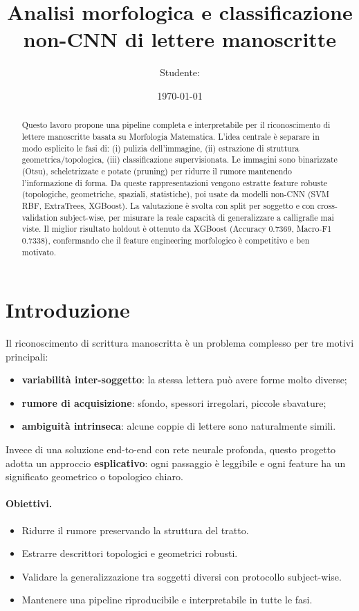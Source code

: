 \documentclass[a4paper,12pt]{article}
\title{Analisi morfologica e classificazione non-CNN di lettere manoscritte}
\author{Studente: \rule{6cm}{0.4pt}}
\date{\today}
\begin{document}
\maketitle

\begin{abstract}
Questo lavoro propone una pipeline completa e interpretabile per il riconoscimento di lettere manoscritte basata su Morfologia Matematica.
L'idea centrale è separare in modo esplicito le fasi di: (i) pulizia dell'immagine, (ii) estrazione di struttura geometrica/topologica, (iii) classificazione supervisionata.
Le immagini sono binarizzate (Otsu), scheletrizzate e potate (pruning) per ridurre il rumore mantenendo l'informazione di forma.
Da queste rappresentazioni vengono estratte feature robuste (topologiche, geometriche, spaziali, statistiche), poi usate da modelli non-CNN (SVM RBF, ExtraTrees, XGBoost).
La valutazione è svolta con split per soggetto e con cross-validation subject-wise, per misurare la reale capacità di generalizzare a calligrafie mai viste.
Il miglior risultato holdout è ottenuto da XGBoost (Accuracy 0.7369, Macro-F1 0.7338), confermando che il feature engineering morfologico è competitivo e ben motivato.
\end{abstract}

\section{Introduzione}
Il riconoscimento di scrittura manoscritta è un problema complesso per tre motivi principali:
\begin{itemize}[leftmargin=1.5em]
  \item \textbf{variabilità inter-soggetto}: la stessa lettera può avere forme molto diverse;
  \item \textbf{rumore di acquisizione}: sfondo, spessori irregolari, piccole sbavature;
  \item \textbf{ambiguità intrinseca}: alcune coppie di lettere sono naturalmente simili.
\end{itemize}

Invece di una soluzione end-to-end con rete neurale profonda, questo progetto adotta un approccio \textbf{esplicativo}: ogni passaggio è leggibile e ogni feature ha un significato geometrico o topologico chiaro. 

\paragraph{Obiettivi.}
\begin{itemize}[leftmargin=1.5em]
  \item Ridurre il rumore preservando la struttura del tratto.
  \item Estrarre descrittori topologici e geometrici robusti.
  \item Validare la generalizzazione tra soggetti diversi con protocollo subject-wise.
  \item Mantenere una pipeline riproducibile e interpretabile in tutte le fasi.
\end{itemize}
\end{document}
